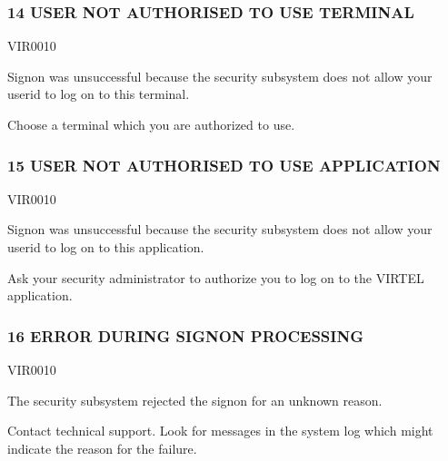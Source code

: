 \documentclass[letterpaper,10pt,english]{sphinxmanual}
\begin{document}
\subsubsection{14 USER NOT AUTHORISED TO USE TERMINAL}
\label{\detokenize{messages:user-not-authorised-to-use-terminal}}\begin{description}
\sphinxAtStartPar
VIR0010

\sphinxAtStartPar
Signon was unsuccessful because the security subsystem does not allow your userid to log on to this terminal.

\sphinxAtStartPar
Choose a terminal which you are authorized to use.

\end{description}


\subsubsection{15 USER NOT AUTHORISED TO USE APPLICATION}
\label{\detokenize{messages:user-not-authorised-to-use-application}}\begin{description}
\sphinxAtStartPar
VIR0010

\sphinxAtStartPar
Signon was unsuccessful because the security subsystem does not allow your userid to log on to this application.

\sphinxAtStartPar
Ask your security administrator to authorize you to log on to the VIRTEL application.

\end{description}


\subsubsection{16 ERROR DURING SIGN\sphinxhyphen{}ON PROCESSING}
\label{\detokenize{messages:error-during-sign-on-processing}}\begin{description}
\sphinxAtStartPar
VIR0010

\sphinxAtStartPar
The security subsystem rejected the signon for an unknown reason.

\sphinxAtStartPar
Contact technical support. Look for messages in the system log which might indicate the reason for the failure.

\end{description}
\end{document}

